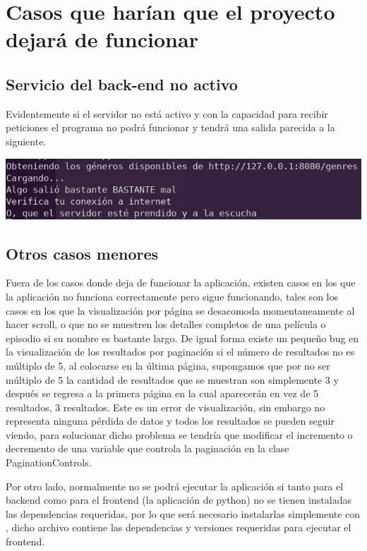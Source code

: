 \section{Casos que harían que el proyecto dejará de funcionar}

\subsection{Servicio del back-end no activo}
Evidentemente si el servidor no está activo y con la capacidad para recibir peticiones el programa no podrá funcionar y tendrá una salida parecida a la siguiente.

\begin{center}
	\includegraphics[width=0.75\linewidth]{error-server}
\end{center}

\subsection{Otros casos menores}
Fuera de los casos donde deja de funcionar la aplicación, existen casos en los que la aplicación no funciona correctamente pero sigue funcionando, tales son los casos en los que la visualización por página se desacomoda momentaneamente al hacer scroll, o que no se muestren los detalles completos de una película o episodio si su nombre es bastante largo. De igual forma existe un pequeño bug en la visualización de los resultados por paginación si el número de resultados no es múltiplo de 5, al colocarse en la última página, supongamos que por no ser múltiplo de 5 la cantidad de resultados que se muestran son simplemente 3 y después se regresa a la primera página en la cual aparecerán en vez de 5 resultados, 3 resultados. Este es un error de visualización, sin embargo no representa ninguna pérdida de datos y todos los resultados se pueden seguir viendo, para solucionar dicho problema se tendría que modificar el incremento o decremento de una variable que controla la paginación en la clase PaginationControls.

Por otro lado, normalmente no se podrá ejecutar la aplicación si tanto para el backend como para el frontend (la aplicación de python) no se tienen instaladas las dependencias requeridas, por lo que será necesario instalarlas simplemente con , dicho archivo  contiene las dependencias y versiones requeridas para ejecutar el frontend.

